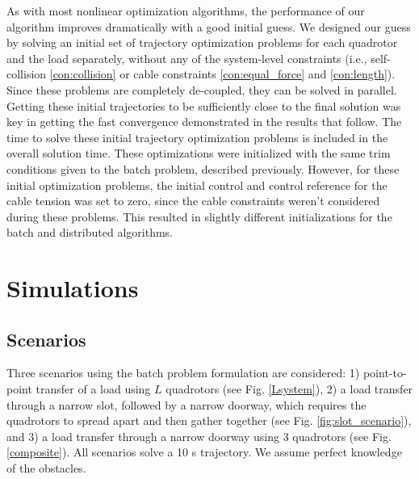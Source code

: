 \documentclass[../root.tex]{subfiles}
\begin{document}
As with most nonlinear optimization algorithms, the performance of our
algorithm improves dramatically with a good initial guess. We designed our
guess by solving an initial set of trajectory optimization problems for each
quadrotor and the load separately, without any of the system-level
constraints (i.e., self-collision \eqref{con:collision} or cable constraints
\eqref{con:equal_force} and \eqref{con:length}). Since these problems are
completely de-coupled, they can be solved in parallel. Getting these initial
trajectories to be sufficiently close to the final solution was key in
getting the fast convergence demonstrated in the results that follow. The
time to solve these initial trajectory optimization problems is included in
the overall solution time. These optimizations were initialized with
the same trim conditions given to the batch problem, described previously.
However, for these initial optimization problems, the initial control and
control reference for the cable tension was set to zero, since the cable
constraints weren't considered during these problems. This resulted in
slightly different initializations for the batch and distributed algorithms.

\section{Simulations} \label{sim_results}

\subsection{Scenarios}
Three scenarios using the batch problem formulation are
considered: 1) point-to-point transfer of a load using $L$ quadrotors (see
Fig. \ref{Lsystem}), 2) a load transfer through a narrow slot,
followed by a narrow doorway, which requires the quadrotors to spread apart
and then gather together (see Fig. \ref{fig:slot_scenario}), and
3) a load transfer through a narrow doorway using 3 quadrotors
(see Fig. \ref{composite}). All scenarios solve a 10 s
trajectory. We assume perfect knowledge of the obstacles.
\end{document}
